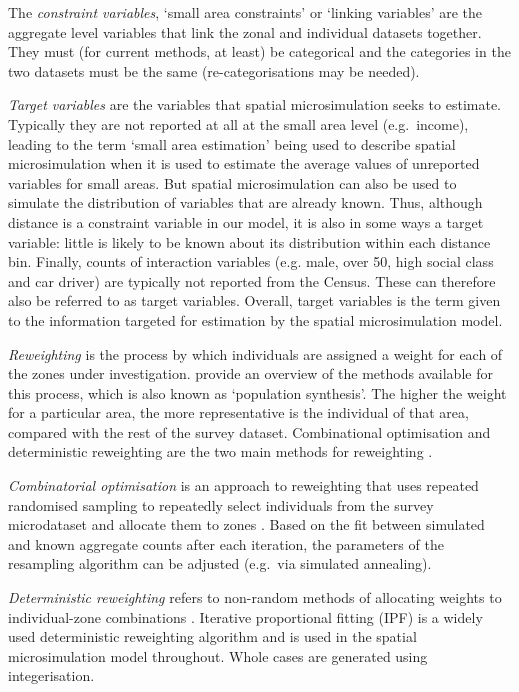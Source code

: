 \documentclass[a4paper, 11pt, twoside]{Thesis}
\begin{document}
The \emph{constraint variables}, `small area constraints' or `linking
variables' are the aggregate level variables that link the zonal and individual
datasets together. They must (for current methods, at least)
be categorical and the categories in the two
datasets must be the same (re-categorisations may be needed).

\emph{Target variables} are the variables that spatial microsimulation seeks
to estimate. Typically they are not reported at all at the small area level
(e.g.~income), leading to the term `small area estimation' being used
to describe spatial microsimulation when it is used to estimate the
average values of unreported variables for small areas. But spatial
microsimulation can also be used to simulate the distribution of variables that
are already known. Thus, although distance is a constraint variable in
our model, it is also in some ways a target variable: 
little is likely to be known about its distribution within each distance bin. 
Finally, counts of interaction
variables (e.g. male, over 50,
high social class and car driver) are typically not reported from the Census.
These can therefore also be referred to as target variables. Overall,
target variables is the term given to the information targeted for
estimation by the spatial microsimulation model.

\emph{Reweighting} is the process by which individuals are assigned a weight
for each of the zones under investigation. \citet{harland2012} provide
an overview of the methods available for this process, which is
also known as `population synthesis'. The higher the weight for a
particular area, the more representative is the individual of that area,
compared with the rest of the survey dataset. Combinational optimisation
and deterministic reweighting 
are the two main methods for reweighting \citep{Hermes2012a}.

\emph{Combinatorial optimisation}  is an
approach to reweighting that uses repeated randomised sampling to
repeatedly select individuals from the survey microdataset and allocate them to
zones \citep{Williamson1998, Voas2000}. Based on the fit between simulated
and known aggregate counts after each
iteration, the parameters of the resampling algorithm can be adjusted (e.g.~via
simulated annealing).

\emph{Deterministic reweighting} refers to non-random methods of allocating
weights to individual-zone combinations \citep{Ballas2007simb, Tomintz2008}.
Iterative proportional fitting (IPF)
is a widely used deterministic reweighting algorithm and is used in the
spatial microsimulation model throughout. Whole cases
are generated using integerisation.
\end{document}

